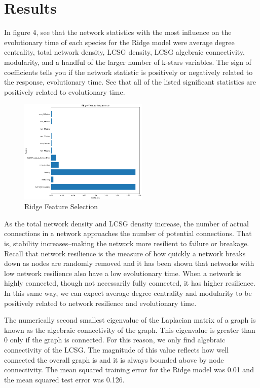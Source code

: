 \documentclass[12pt]{article}
\begin{document}
\section{Results}
In figure 4, see that the network statistics with the most influence on the evolutionary time of each species for the Ridge model were average degree centrality, total network density, LCSG density, LCSG algebraic connectivity, modularity, and a handful of the larger number of k-stars variables. The sign of coefficients tells you if the network statistic is positively or negatively related to the response, evolutionary time. See that all of the listed significant statistics are positively related to evolutionary time.
\begin{figure}
  \vspace{-20pt}
  \begin{center}
    \includegraphics[width=0.548\textwidth]{PPIN_fig3}
  \end{center}
  \vspace{-20pt}
  \caption{Ridge Feature Selection}
  \vspace{-10pt}
\end{figure}
\indent As the total network density and LCSG density increase, the number of actual connections in a network approaches the number of potential connections. That is, stability increases--making the network more resilient to failure or breakage. Recall that network resilience is the measure of how quickly a network breaks down as nodes are randomly removed and it has been shown that networks with low network resilience also have a low evolutionary time. When a network is highly connected, though not necessarily fully connected, it has higher resilience. In this same way, we can expect average degree centrality and modularity to be positively related to network resilience and evolutionary time.

The numerically second smallest eigenvalue of the Laplacian matrix of a graph is known as the algebraic connectivity of the graph. This eigenvalue is greater than 0 only if the graph is connected. For this reason, we only find algebraic connectivity of the LCSG. The magnitude of this value reflects how well connected the overall graph is and it is always bounded above by node connectivity. The mean squared training error for the Ridge model was 0.01 and the mean squared test error was 0.126. 
\end{document}
